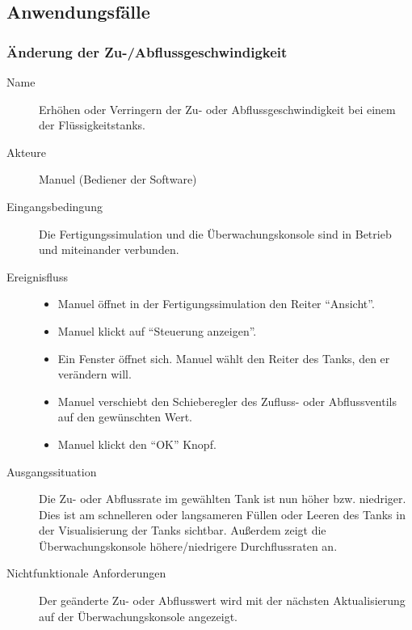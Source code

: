\documentclass[parskip=full]{scrartcl}
\begin{document}
\subsection{Anwendungsfälle}
\subsubsection{Änderung der Zu-/Abflussgeschwindigkeit}
\begin{description}
 \item[Name] Erhöhen oder Verringern der Zu- oder Abflussgeschwindigkeit bei einem der Flüssigkeitstanks.
 \item[Akteure] Manuel (Bediener der Software)
 \item[Eingangsbedingung] Die Fertigungssimulation und die Überwachungskonsole sind in Betrieb und miteinander verbunden.
 \item[Ereignisfluss]
 \begin{itemize}[noitemsep]
  \item Manuel öffnet in der Fertigungssimulation den Reiter ``Ansicht''.
  \item Manuel klickt auf ``Steuerung anzeigen''.
  \item Ein Fenster öffnet sich. Manuel wählt den Reiter des Tanks, den er verändern will.
  \item Manuel verschiebt den Schieberegler des Zufluss- oder Abflussventils auf den gewünschten Wert.
  \item Manuel klickt den ``OK'' Knopf.
 \end{itemize}
 \item[Ausgangssituation] Die Zu- oder Abflussrate im gewählten Tank ist nun höher bzw. niedriger. Dies ist am schnelleren oder langsameren Füllen oder Leeren des Tanks in der Visualisierung der Tanks sichtbar.
 Außerdem zeigt die Überwachungskonsole höhere/niedrigere Durchflussraten an.
 \item [Nichtfunktionale Anforderungen] Der geänderte Zu- oder Abflusswert wird mit der nächsten Aktualisierung auf der Überwachungskonsole angezeigt.
\end{description}
\end{document}
